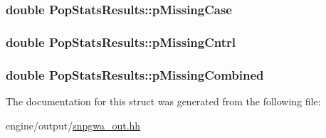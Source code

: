 \label{structPopStatsResults_a24ddefc14228bb197db10dd944445ba2}
\hypertarget{structPopStatsResults_afde7ddd5cc992a5ef18330d6263e2369}{
\subsubsection[{pMissingCase}]{\setlength{\rightskip}{0pt plus 5cm}double {\bf PopStatsResults::pMissingCase}}}
\label{structPopStatsResults_afde7ddd5cc992a5ef18330d6263e2369}
\hypertarget{structPopStatsResults_a5d24ec37813555025b0ea26ac43cf6f7}{
\subsubsection[{pMissingCntrl}]{\setlength{\rightskip}{0pt plus 5cm}double {\bf PopStatsResults::pMissingCntrl}}}
\label{structPopStatsResults_a5d24ec37813555025b0ea26ac43cf6f7}
\hypertarget{structPopStatsResults_a90c1d1e0d9342db630347c9d29c1cb99}{
\subsubsection[{pMissingCombined}]{\setlength{\rightskip}{0pt plus 5cm}double {\bf PopStatsResults::pMissingCombined}}}
\label{structPopStatsResults_a90c1d1e0d9342db630347c9d29c1cb99}


The documentation for this struct was generated from the following file:\begin{DoxyCompactItemize}
\item 
engine/output/\hyperlink{snpgwa__out_8hh}{snpgwa\_\-out.hh}\end{DoxyCompactItemize}
